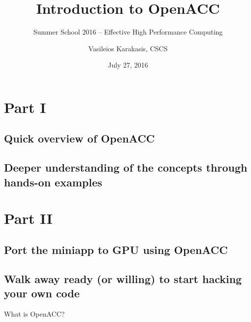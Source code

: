 \documentclass[aspectratio=1610]{beamer}
\author{Vasileios Karakasis, CSCS}
\title{Introduction to OpenACC}
\subtitle{Summer School 2016 -- Effective High Performance Computing}
\date{July 27, 2016}
\begin{document}
\cscstitle


\section{Part I}
\subsection{Quick overview of OpenACC}
\subsection{Deeper understanding of the concepts through hands-on examples}

\section{Part II}
\subsection{Port the miniapp to GPU using OpenACC}
\subsection{Walk away ready (or willing) to start hacking your own code}

\begin{frame}{What is OpenACC?}
\end{frame}



\end{document}
